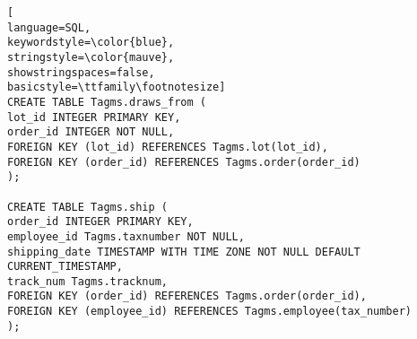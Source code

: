 \begin{lstlisting}[
language=SQL,
keywordstyle=\color{blue},
stringstyle=\color{mauve},
showstringspaces=false,
basicstyle=\ttfamily\footnotesize]
CREATE TABLE Tagms.draws_from (
lot_id INTEGER PRIMARY KEY,
order_id INTEGER NOT NULL,
FOREIGN KEY (lot_id) REFERENCES Tagms.lot(lot_id),
FOREIGN KEY (order_id) REFERENCES Tagms.order(order_id)
);

CREATE TABLE Tagms.ship (
order_id INTEGER PRIMARY KEY,
employee_id Tagms.taxnumber NOT NULL,
shipping_date TIMESTAMP WITH TIME ZONE NOT NULL DEFAULT CURRENT_TIMESTAMP,
track_num Tagms.tracknum,
FOREIGN KEY (order_id) REFERENCES Tagms.order(order_id),
FOREIGN KEY (employee_id) REFERENCES Tagms.employee(tax_number)
);


\end{lstlisting}